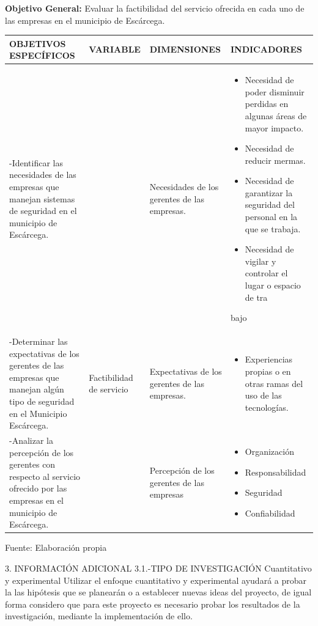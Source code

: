 \documentclass[12pt] {report}
\begin{document}
\textbf{Objetivo General:} Evaluar la factibilidad del servicio ofrecida en cada uno de las empresas en el municipio de Escárcega.
\begin{center}
    \begin{tabular}{ | p{3.5cm} | p{2cm}|  p{3cm} | p{5cm} |}
    \hline
    OBJETIVOS ESPECÍFICOS& VARIABLE & DIMENSIONES & INDICADORES \\ \hline
    -Identificar las necesidades de las empresas que manejan sistemas de seguridad en el municipio de Escárcega. &  & Necesidades de los gerentes de las empresas. & 
\begin{itemize}
\item Necesidad de poder disminuir perdidas en algunas áreas de mayor impacto.
\item Necesidad de reducir mermas.
\item Necesidad de garantizar la seguridad del personal en la que se trabaja.
\item Necesidad de vigilar y controlar el lugar o espacio de tra
\end{itemize}
bajo
 
 \\ \hline
    -Determinar las expectativas de los gerentes de las empresas que manejan algún tipo de seguridad en el Municipio Escárcega. & Factibilidad  de servicio & Expectativas de los gerentes de las empresas. & 
\begin{itemize}
\item Experiencias propias o en otras ramas del uso de las tecnologías.
\end{itemize}
 \\ \hline
    
    
    -Analizar la percepción de los gerentes con respecto al servicio ofrecido por las empresas en el municipio de Escárcega. & & Percepción de los gerentes de las empresas &
\begin{itemize}
\item Organización
\item Responsabilidad 
\item Seguridad
\item Confiabilidad
\end{itemize}
 \\
    \hline
       \end{tabular}
      
\end{center}
 Fuente: Elaboración propia


3. INFORMACIÓN ADICIONAL
3.1.-TIPO DE INVESTIGACIÓN
Cuantitativo y experimental 
Utilizar el enfoque cuantitativo y experimental ayudará a probar la las hipótesis que se planearán o a establecer nuevas ideas del proyecto, de igual forma considero que para este proyecto es necesario probar los resultados de la investigación, mediante la implementación de ello.\\
\end{document}
